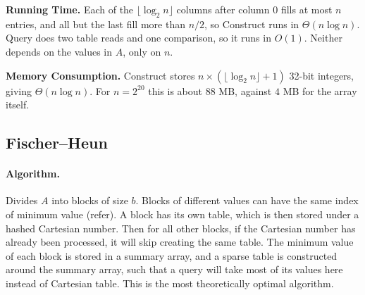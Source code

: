 \documentclass{article}
\theoremstyle{definition}
\begin{document}
\textbf{Running Time.} Each of the $\lfloor \log_2 n \rfloor$ columns after column $0$ fills at most $n$ entries,
and all but the last fill more than $n/2$, so Construct runs in $\Theta(n \log n)$. Query does two
table reads and one comparison, so it runs in $O(1)$. Neither depends on the values in $A$, only
on $n$.
 
\textbf{Memory Consumption.} Construct stores $n \times (\lfloor \log_2 n \rfloor + 1)$ 32-bit
integers, giving $\Theta(n \log n)$. For $n = 2^{20}$ this is about $88$ MB, against $4$ MB for
the array itself.

\subsection{Fischer--Heun}
\paragraph{Algorithm.}
Divides $A$ into blocks of size $b$.  Blocks of different values can have the same index of minimum value (refer).  A block has its own table, which is then stored under a hashed Cartesian number.  Then for all other blocks, if the Cartesian number has already been processed, it will skip creating the same table.  The minimum value of each block is stored in a summary array, and a sparse table is constructed around the summary array, such that a query will take most of its values here instead of Cartesian table.  This is the most theoretically optimal algorithm.
\end{document}
